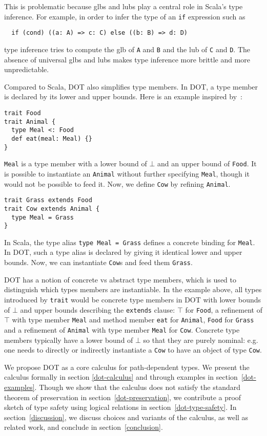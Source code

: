 \documentclass[9pt]{sigplanconf}
\def\code{\lstinline}  % shorter version so you can write \code|String[Foo]|
\newcommand{\Top}{\top}%
\newcommand{\Bot}{\bot}%
\begin{document}
This is problematic because glbs and lubs play a central role in
Scala's type inference. For example, in order to infer the type of an
\code{if} expression such as
\begin{lstlisting}
  if (cond) ((a: A) => c: C) else ((b: B) => d: D)
\end{lstlisting}
type inference tries to compute the glb of \code{A} and \code{B} and
the lub of \code{C} and \code{D}. The absence of universal glbs and
lubs makes type inference more brittle and more unpredictable.

Compared to Scala, DOT also simplifies type members. In DOT, a type
member is declared by its lower and upper bounds. Here is an example
inspired by~\cite{vt}:
\begin{lstlisting}
trait Food
trait Animal {
  type Meal <: Food
  def eat(meal: Meal) {}
}
\end{lstlisting}
\code{Meal} is a type member with a lower bound of $\Bot$ and an upper
bound of \code{Food}. It is possible to instantiate an \code{Animal}
without further specifying \code{Meal}, though it would not be
possible to feed it. Now, we define \code{Cow} by refining
\code{Animal}.
\begin{lstlisting}
trait Grass extends Food
trait Cow extends Animal {
  type Meal = Grass
}
\end{lstlisting}
In Scala, the type alias \code{type Meal = Grass} defines a concrete
binding for \code{Meal}. In DOT, such a type alias is declared by
giving it identical lower and upper bounds. Now, we can instantiate
\code{Cow}s and feed them \code{Grass}.

DOT has a notion of concrete vs abstract type members, which is used
to distinguish which types members are instantiable. In the example
above, all types introduced by \code{trait} would be concrete type
members in DOT with lower bounds of $\Bot$ and upper bounds describing
the \code{extends} clause: $\Top$ for \code{Food}, a refinement of
$\Top$ with type member \code{Meal} and method member \code{eat} for
\code{Animal}, \code{Food} for \code{Grass} and a refinement of
\code{Animal} with type member \code{Meal} for \code{Cow}. Concrete
type members typically have a lower bound of $\Bot$ so that they are
purely nominal: e.g. one needs to directly or indirectly instantiate a
\code{Cow} to have an object of type \code{Cow}.

We propose DOT as a core calculus for path-dependent types. We present
the calculus formally in section \ref{dot-calculus} and through
examples in section~\ref{dot-examples}. Though we show that the
calculus does not satisfy the standard theorem of preservation in
section~\ref{dot-preservation}, we contribute a proof sketch of type
safety using logical relations in section~\ref{dot-type-safety}. In
section~\ref{discussion}, we discuss choices and variants of the
calculus, as well as related work, and conclude in
section~\ref{conclusion}.
\end{document}
